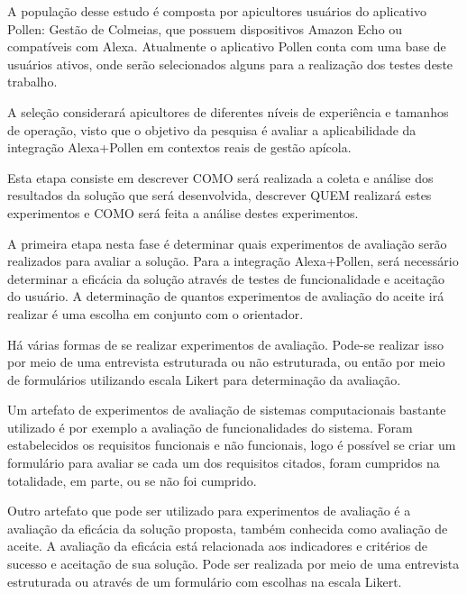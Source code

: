 \label{sec:esboco-projeto-pratica}

A população desse estudo é composta por apicultores usuários do aplicativo Pollen: Gestão de Colmeias, que possuem dispositivos Amazon Echo ou compatíveis com Alexa. 
Atualmente o aplicativo Pollen conta com uma base de usuários ativos, onde serão selecionados alguns para a realização dos testes deste trabalho.

A seleção considerará apicultores de diferentes níveis de experiência e tamanhos de operação, visto que o objetivo da pesquisa é avaliar a aplicabilidade da integração Alexa+Pollen em contextos reais de gestão apícola.

\label{sec:coleta-analise-resultados}

Esta etapa consiste em descrever COMO será realizada a coleta e análise dos resultados da solução que será desenvolvida, descrever QUEM realizará estes experimentos e COMO será feita a análise destes experimentos.

A primeira etapa nesta fase é determinar quais experimentos de avaliação serão realizados para avaliar a solução. Para a integração Alexa+Pollen, será necessário determinar a eficácia da solução através de testes de funcionalidade e aceitação do usuário. A determinação de quantos experimentos de avaliação do aceite irá realizar é uma escolha em conjunto com o orientador.

Há várias formas de se realizar experimentos de avaliação. Pode-se realizar isso por meio de uma entrevista estruturada ou não estruturada, ou então por meio de formulários utilizando escala Likert para determinação da avaliação.

Um artefato de experimentos de avaliação de sistemas computacionais bastante utilizado é por exemplo a avaliação de funcionalidades do sistema. Foram estabelecidos os requisitos funcionais e não funcionais, logo é possível se criar um formulário para avaliar se cada um dos requisitos citados, foram cumpridos na totalidade, em parte, ou se não foi cumprido.

Outro artefato que pode ser utilizado para experimentos de avaliação é a avaliação da eficácia da solução proposta, também conhecida como avaliação de aceite. A avaliação da eficácia está relacionada aos indicadores e critérios de sucesso e aceitação de sua solução. Pode ser realizada por meio de uma entrevista estruturada ou através de um formulário com escolhas na escala Likert.

